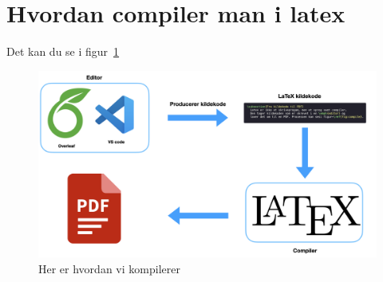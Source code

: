 \documentclass{article}
\begin{document}
\section{Hvordan compiler man i latex}
 Det kan du se i figur~\ref{fig:comp}
 \begin{figure}[h]
   \includegraphics[width=0.8\linewidth]{assets/compile.png}
   \caption{Her er hvordan vi kompilerer}\label{fig:comp}
 \end{figure}
\end{document}
